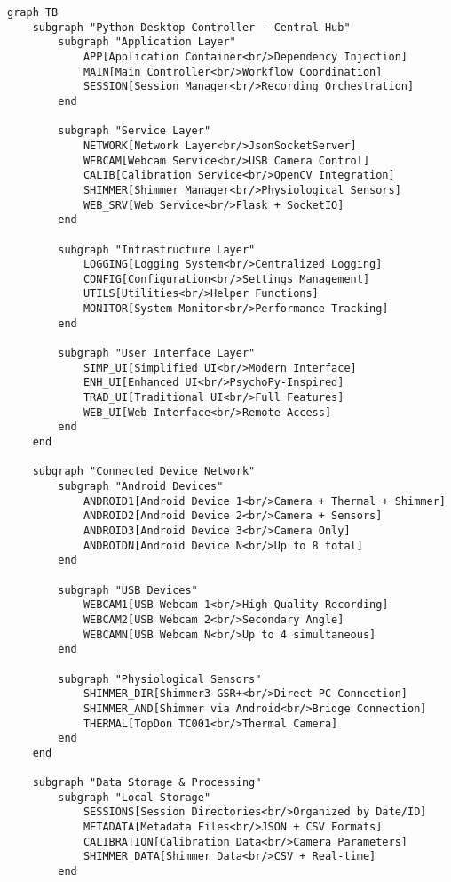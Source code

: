 \documentclass[11pt,a4paper]{article}
\begin{document}
\begin{verbatim}
graph TB
    subgraph "Python Desktop Controller - Central Hub"
        subgraph "Application Layer"
            APP[Application Container<br/>Dependency Injection]
            MAIN[Main Controller<br/>Workflow Coordination]
            SESSION[Session Manager<br/>Recording Orchestration]
        end

        subgraph "Service Layer"
            NETWORK[Network Layer<br/>JsonSocketServer]
            WEBCAM[Webcam Service<br/>USB Camera Control]
            CALIB[Calibration Service<br/>OpenCV Integration]
            SHIMMER[Shimmer Manager<br/>Physiological Sensors]
            WEB_SRV[Web Service<br/>Flask + SocketIO]
        end

        subgraph "Infrastructure Layer"
            LOGGING[Logging System<br/>Centralized Logging]
            CONFIG[Configuration<br/>Settings Management]
            UTILS[Utilities<br/>Helper Functions]
            MONITOR[System Monitor<br/>Performance Tracking]
        end

        subgraph "User Interface Layer"
            SIMP_UI[Simplified UI<br/>Modern Interface]
            ENH_UI[Enhanced UI<br/>PsychoPy-Inspired]
            TRAD_UI[Traditional UI<br/>Full Features]
            WEB_UI[Web Interface<br/>Remote Access]
        end
    end

    subgraph "Connected Device Network"
        subgraph "Android Devices"
            ANDROID1[Android Device 1<br/>Camera + Thermal + Shimmer]
            ANDROID2[Android Device 2<br/>Camera + Sensors]
            ANDROID3[Android Device 3<br/>Camera Only]
            ANDROIDN[Android Device N<br/>Up to 8 total]
        end

        subgraph "USB Devices"
            WEBCAM1[USB Webcam 1<br/>High-Quality Recording]
            WEBCAM2[USB Webcam 2<br/>Secondary Angle]
            WEBCAMN[USB Webcam N<br/>Up to 4 simultaneous]
        end

        subgraph "Physiological Sensors"
            SHIMMER_DIR[Shimmer3 GSR+<br/>Direct PC Connection]
            SHIMMER_AND[Shimmer via Android<br/>Bridge Connection]
            THERMAL[TopDon TC001<br/>Thermal Camera]
        end
    end

    subgraph "Data Storage & Processing"
        subgraph "Local Storage"
            SESSIONS[Session Directories<br/>Organized by Date/ID]
            METADATA[Metadata Files<br/>JSON + CSV Formats]
            CALIBRATION[Calibration Data<br/>Camera Parameters]
            SHIMMER_DATA[Shimmer Data<br/>CSV + Real-time]
        end


\end{verbatim}
\end{document}
